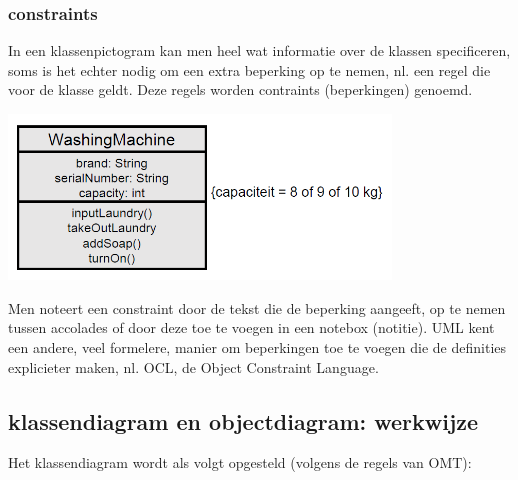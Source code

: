 \subsubsection{constraints}

In een klassenpictogram kan men heel wat informatie over de klassen specificeren, soms is het echter nodig om een extra beperking op te nemen, nl. een regel die voor de klasse geldt. Deze regels worden contraints (beperkingen) genoemd.


\begin{center}
\includegraphics[width=4in]{img/const1}%
\end{center}

Men noteert een constraint door de tekst die de beperking aangeeft, op te nemen tussen accolades of door deze toe te voegen in een notebox (notitie). UML kent een andere, veel formelere, manier om beperkingen toe te voegen die de definities explicieter maken, nl. OCL, de Object Constraint Language.

\subsection{klassendiagram en objectdiagram: werkwijze}

Het klassendiagram wordt als volgt opgesteld (volgens de regels van OMT):

